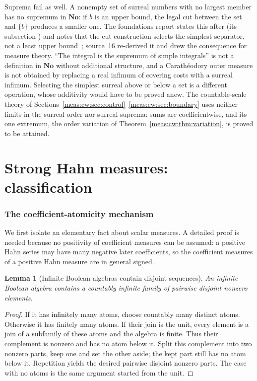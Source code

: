 \documentclass[11pt]{article}
\numberwithin{equation}{section}
\newtheorem{lemma}[theorem]{Lemma}
\theoremstyle{definition}
\theoremstyle{remark}
\newcommand{\No}{\mathbf{No}}
\begin{document}
Suprema fail as well. A nonempty set of surreal numbers with no largest member
has no supremum in $\No$: if $b$ is an upper bound, the legal cut between the
set and $\{b\}$ produces a smaller one. The foundations report states this
after  (its subsection )
and notes that the cut construction selects the simplest separator, not a
least upper bound~\cite{repofound}; source~16 re-derived it and drew the
consequence for measure theory. ``The integral is the supremum of simple
integrals'' is not a definition in $\No$ without additional structure, and a
Carath\'eodory outer measure is not obtained by replacing a real infimum of
covering costs with a surreal infimum. Selecting the simplest surreal above or
below a set is a different operation, whose additivity would have to be proved
anew. The countable-scale theory of
Sections~\ref{meas:cw:sec:control}--\ref{meas:cw:sec:boundary} uses neither
limits in the surreal order nor surreal suprema: sums are coefficientwise, and
its one extremum, the order variation of Theorem~\ref{meas:cw:thm:variation},
is proved to be attained.

\part{Strong Hahn measures: classification}\label{meas:part:strong}

\section{The coefficient-atomicity mechanism}\label{meas:sec:scalar}

We first isolate an elementary fact about scalar measures. A detailed proof is
needed because no positivity of coefficient measures can be assumed: a positive
Hahn series may have many negative later coefficients, so the coefficient
measures of a positive Hahn measure are in general signed.

\begin{lemma}[Infinite Boolean algebras contain disjoint sequences]
\label{meas:lem:boolean}
An infinite Boolean algebra contains a countably infinite family of pairwise
disjoint nonzero elements.
\end{lemma}
\begin{proof}
If it has infinitely many atoms, choose countably many distinct atoms.
Otherwise it has finitely many atoms. If their join is the unit, every element
is a join of a subfamily of these atoms and the algebra is finite. Thus their
complement is nonzero and has no atom below it. Split this complement into two
nonzero parts, keep one and set the other aside; the kept part still has no
atom below it. Repetition yields the desired pairwise disjoint nonzero parts.
The case with no atoms is the same argument started from the unit.
\end{proof}
\end{document}
